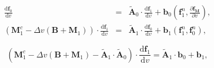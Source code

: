 \documentclass[review]{elsarticle}
\newcommand{\pdv}[2]{\frac{\partial{#1}}{\partial{#2}}}
\newcommand{\vect}[1]{\boldsymbol{#1}}
\newcommand{\matr}[1]{\mathbf{#1}}
\newcommand{\dI}{\text{d}}
\newcommand{\odv}[2]{\frac{\dI #1}{\dI #2}}
\newcommand{\ddv}[2]{\odv{#1}{#2}}
\newcommand{\vmag}{v}
\newcommand{\fM}{f_M}
\newcommand{\vfzero}{\vect{f}_0}
\newcommand{\fone}{\vect{f}_1}
\begin{document}
\begin{eqnarray}
  \ddv{\vfzero}{\vmag}  
  &=& 
  \matr{\tilde{A}}_0 \cdot \ddv{\fone}{\vmag}
  + \vect{b}_0\left(\fone^n, \pdv{\vect{\fM}}{\vmag}\right) ,  
  \label{eq:df0dv} \\
  \left( \matr{M}^c_1 
  - \Delta \vmag \left( \matr{B} + \matr{M}_1 \right) \right) 
  \cdot \ddv{\fone}{\vmag}  
  &=& 
  \matr{\tilde{A}}_1 \cdot \ddv{\vfzero}{\vmag}  
  + \vect{b}_1 \left( \fone^n, \vfzero^n \right) , 
  \label{eq:df1dvdf0dv}
\end{eqnarray}

\begin{equation}
  \left( \matr{M}^c_1 
  - \Delta \vmag \left( \matr{B} + \matr{M}_1 \right) 
  - \matr{\tilde{A}}_1 \cdot \matr{\tilde{A}}_0 \right) 
  \cdot \ddv{\fone}{\vmag}  
  = 
  \matr{\tilde{A}}_1 
  \cdot \vect{b}_0 + \vect{b}_1 , 
  \label{eq:df1dv}
\end{equation}
\end{document}
